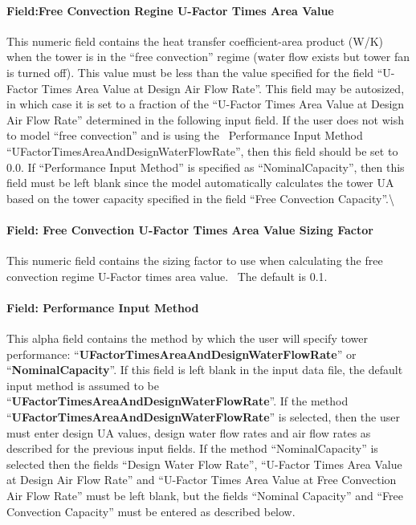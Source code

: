 \paragraph{Field:Free Convection Regine U-Factor Times Area Value}\label{fieldfree-convection-regine-u-factor-times-area-value}

This numeric field contains the heat transfer coefficient-area product (W/K) when the tower is in the ``free convection'' regime (water flow exists but tower fan is turned off). This value must be less than the value specified for the field ``U-Factor Times Area Value at Design Air Flow Rate''. This field may be autosized, in which case it is set to a fraction of the ``U-Factor Times Area Value at Design Air Flow Rate'' determined in the following input field. If the user does not wish to model ``free convection'' and is using the~ Performance Input Method ``UFactorTimesAreaAndDesignWaterFlowRate'', then this field should be set to 0.0. If ``Performance Input Method'' is specified as ``NominalCapacity'', then this field must be left blank since the model automatically calculates the tower UA based on the tower capacity specified in the field ``Free Convection Capacity''.\textbackslash{}

\paragraph{Field: Free Convection U-Factor Times Area Value Sizing Factor}\label{field-free-convection-u-factor-times-area-value-sizing-factor}

This numeric field contains the sizing factor to use when calculating the free convection regime U-Factor times area value.~ The default is 0.1.

\paragraph{Field: Performance Input Method}\label{field-performance-input-method}

This alpha field contains the method by which the user will specify tower performance: ``\textbf{UFactorTimesAreaAndDesignWaterFlowRate}'' or ``\textbf{NominalCapacity}''. If this field is left blank in the input data file, the default input method is assumed to be ``\textbf{UFactorTimesAreaAndDesignWaterFlowRate}''. If the method ``\textbf{UFactorTimesAreaAndDesignWaterFlowRate}'' is selected, then the user must enter design UA values, design water flow rates and air flow rates as described for the previous input fields. If the method ``NominalCapacity'' is selected then the fields ``Design Water Flow Rate'', ``U-Factor Times Area Value at Design Air Flow Rate'' and ``U-Factor Times Area Value at Free Convection Air Flow Rate'' must be left blank, but the fields ``Nominal Capacity'' and ``Free Convection Capacity'' must be entered as described below.

